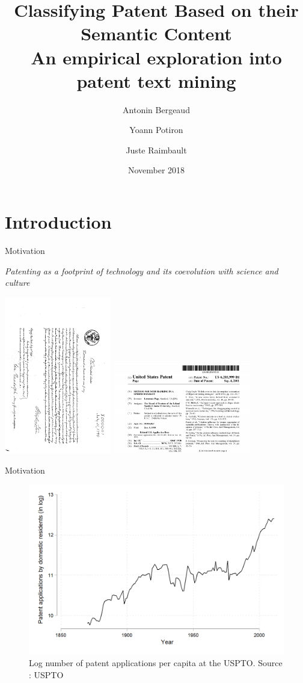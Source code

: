 \documentclass{beamer}
\title[Patent Mining]{Classifying Patent Based on their Semantic Content \\ An empirical exploration into patent text mining}
\author[Bergeaud, Potiron, Raimbault]{Antonin Bergeaud \and Yoann Potiron \and Juste Raimbault}
\institute[]{Banque de France, Keio University and ISC-PIF}
\date{November 2018}
\begin{document}
\begin{frame}
  \titlepage
\end{frame}

\section{Introduction}
\begin{frame}{Motivation}
    
    \textit{Patenting as a footprint of technology and its coevolution with science and culture~\cite{bais2010praise}}

\bigskip
\centering

\includegraphics[width=0.35\textwidth,angle=90]{figures/USX1}
\includegraphics[width=0.45\textwidth]{figures/pageRank}
    
\end{frame}
\begin{frame}{Motivation}
    \begin{figure}
        \includegraphics[width=0.8\linewidth]{figures/patent_usa.png}
        \caption{Log number of patent applications per capita at the USPTO. Source : USPTO}
    \end{figure}
\end{frame}
\end{document}

